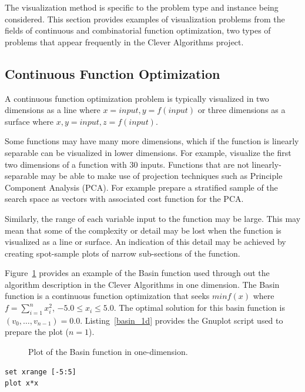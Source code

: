 \documentclass[a4paper, 11pt]{article}
\begin{document}
The visualization method is specific to the problem type and instance being considered. 
This section provides examples of visualization problems from the fields of continuous and combinatorial function optimization, two types of problems that appear frequently in the Clever Algorithms project.

\subsection{Continuous Function Optimization}
A continuous function optimization problem is typically visualized in two dimensions as a line where $x=input, y=f(input)$ or three dimensions as a surface where $x,y=input, z=f(input)$. 

Some functions may have many more dimensions, which if the function is linearly separable can be visualized in lower dimensions. For example, visualize the first two dimensions of a function with 30 inputs. Functions that are not linearly-separable may be able to make use of projection techniques such as Principle Component Analysis (PCA). For example prepare a stratified sample of the search space as vectors with associated cost function for the PCA.

Similarly, the range of each variable input to the function may be large. This may mean that some of the complexity or detail may be lost when the function is visualized as a line or surface. An indication of this detail may be achieved by creating spot-sample plots of narrow sub-sections of the function. 

Figure~\ref{plot:basin1} provides an example of the Basin function used through out the algorithm description in the Clever Algorithms in one dimension. The Basin function is a  continuous function optimization that seeks $min f(x)$ where $f=\sum_{i=1}^n x_{i}^2$, $-5.0\leq x_i \leq 5.0$. The optimal solution for this basin function is $(v_0,\ldots,v_{n-1})=0.0$. Listing~\ref{basin_1d} provides the Gnuplot script used to prepare the plot ($n=1$).

\begin{figure}[htp]
\centering

\caption{Plot of the Basin function in one-dimension.}
\label{plot:basin1}
\end{figure}

\begin{lstlisting}[caption=Gnuplot script for plotting the Basin function in one-dimension., label=basin_1d]
set xrange [-5:5]
plot x*x
\end{lstlisting}
\end{document}
